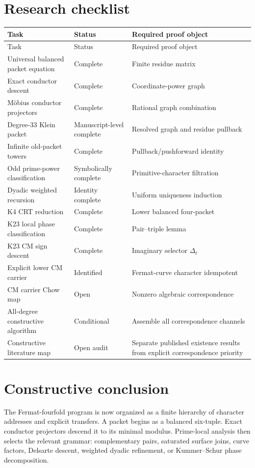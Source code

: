 \documentclass[11pt,oneside]{book}
\theoremstyle{definition}
\theoremstyle{remark}
\begin{document}
\chapter{Research checklist}
\begin{longtable}{p{}p{}p{}}
\toprule
Task & Status & Required proof object \\
\midrule\endfirsthead
\toprule
Task & Status & Required proof object \\
\midrule\endhead
Universal balanced packet equation & Complete & Finite residue matrix \\
Exact conductor descent & Complete & Coordinate-power graph \\
M\"obius conductor projectors & Complete & Rational graph combination \\
Degree-33 Klein packet & Manuscript-level complete & Resolved graph and residue pullback \\
Infinite old-packet towers & Complete & Pullback/pushforward identity \\
Odd prime-power classification & Symbolically complete & Primitive-character filtration \\
Dyadic weighted recursion & Identity complete & Uniform uniqueness induction \\
K4 CRT reduction & Complete & Lower balanced four-packet \\
K23 local phase classification & Complete & Pair--triple lemma \\
K23 CM sign descent & Complete & Imaginary selector $\Delta_\ell$ \\
Explicit lower CM carrier & Identified & Fermat-curve character idempotent \\
CM carrier Chow map & Open & Nonzero algebraic correspondence \\
All-degree constructive algorithm & Conditional & Assemble all correspondence channels \\
Constructive literature map & Open audit & Separate published existence results from explicit correspondence priority \\
\bottomrule
\end{longtable}



\chapter{Constructive conclusion}
The Fermat-fourfold program is now organized as a finite hierarchy of character addresses and explicit transfers. A packet begins as a balanced six-tuple. Exact conductor projectors descend it to its minimal modulus. Prime-local analysis then selects the relevant grammar: complementary pairs, saturated surface joins, curve factors, Delsarte descent, weighted dyadic refinement, or Kummer--Schur phase decomposition.
\end{document}
